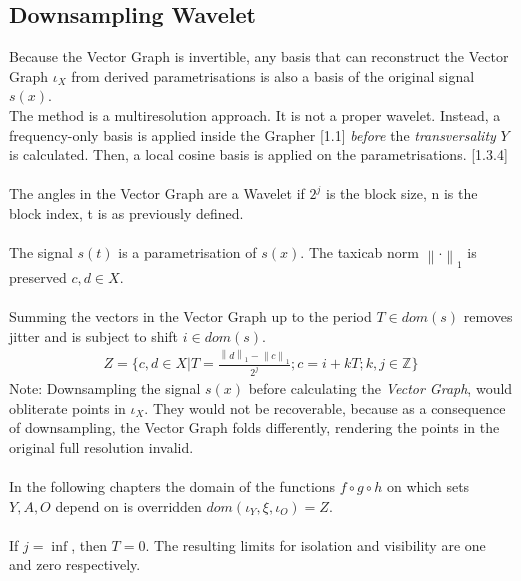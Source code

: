 \documentclass{report}
\newcommand\norm[1]{\left\lVert#1\right\rVert}
\begin{document}
\subsection{Downsampling Wavelet}
Because the Vector Graph is invertible, any basis that can reconstruct the Vector Graph $\iota_{X}$ from derived parametrisations is also a basis of the original signal $s(x)$.\\
The method is a multiresolution approach. It is not a proper wavelet. Instead, a frequency-only basis is applied inside the Grapher \cite{Stopeight}[1.1] \emph{before} the \emph{transversality} $Y$ is calculated. Then, a local cosine basis is applied on the parametrisations. \cite{Mallat}[1.3.4]\\\\
The angles in the Vector Graph are a Wavelet if $2^j$ is the block size, n is the block index, t is as previously defined.\\\\
The signal $s(t)$ is a parametrisation of $s(x)$. The taxicab norm $\norm{\cdot}_{1}$ is preserved $c,d \in X$.\\\\
Summing the vectors in the Vector Graph up to the period $T \in dom(s)$ removes jitter and is subject to shift $i \in dom(s)$.
\begin{align}
Z = \{c,d \in X \vert T=\frac{\norm{d}_1-\norm{c}_1}{2^j};c=i+kT;k,j \in \mathbb{Z}\}
\end{align}
Note: Downsampling the signal $s(x)$ before calculating the \emph{Vector Graph}, would obliterate points in $\iota_{X}$. They would not be recoverable, because as a consequence of downsampling, the Vector Graph folds differently, rendering the points in the original full resolution invalid.\\\\
In the following chapters the domain of the functions $f \circ g \circ h$ on which sets $Y,A,O$ depend on is overridden $dom(\iota_{Y},\xi,\iota_{O})=Z$.\\\\
If $j=\inf$, then $T=0$. The resulting limits for isolation and visibility are one and zero respectively.
\end{document}
